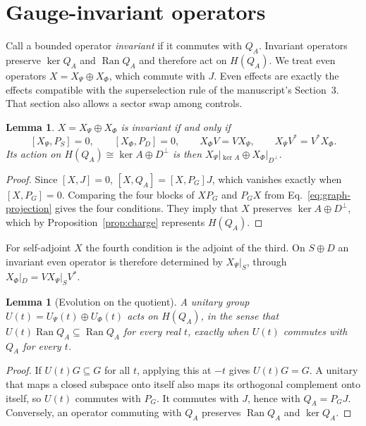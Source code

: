 \documentclass[11pt]{article}
\newtheorem{lemma}[proposition]{Lemma}
\theoremstyle{remark}
\newcommand{\Ran}{\operatorname{Ran}}
\begin{document}
\section{Gauge-invariant operators}

Call a bounded operator \emph{invariant} if it commutes with $Q_A$. Invariant operators preserve $\ker Q_A$ and $\Ran Q_A$ and therefore act on $H(Q_A)$. We treat even operators $X=X_\Psi\oplus X_\Phi$, which commute with $J$. Even effects are exactly the effects compatible with the superselection rule of the manuscript's Section~3. That section also allows a sector swap among controls.

\begin{lemma}\label{lem:invariant}
$X=X_\Psi\oplus X_\Phi$ is invariant if and only if
\[
 [X_\Psi,P_S]=0,\qquad [X_\Phi,P_D]=0,\qquad X_\Phi V=VX_\Psi,\qquad X_\Psi V^*=V^*X_\Phi .
\]
Its action on $H(Q_A)\cong\ker A\oplus D^\perp$ is then $X_\Psi|_{\ker A}\oplus X_\Phi|_{D^\perp}$.
\end{lemma}

\begin{proof}
Since $[X,J]=0$, $[X,Q_A]=[X,P_G]J$, which vanishes exactly when $[X,P_G]=0$. Comparing the four blocks of $XP_G$ and $P_GX$ from Eq.~\eqref{eq:graph-projection} gives the four conditions. They imply that $X$ preserves $\ker A\oplus D^\perp$, which by Proposition~\ref{prop:charge} represents $H(Q_A)$.
\end{proof}

For self-adjoint $X$ the fourth condition is the adjoint of the third. On $S\oplus D$ an invariant even operator is therefore determined by $X_\Psi|_S$, through $X_\Phi|_D=VX_\Psi|_SV^*$.

\begin{lemma}[Evolution on the quotient]\label{lem:quotient}
A unitary group $U(t)=U_\Psi(t)\oplus U_\Phi(t)$ acts on $H(Q_A)$, in the sense that $U(t)\Ran Q_A\subseteq\Ran Q_A$ for every real $t$, exactly when $U(t)$ commutes with $Q_A$ for every $t$.
\end{lemma}

\begin{proof}
If $U(t)G\subseteq G$ for all $t$, applying this at $-t$ gives $U(t)G=G$. A unitary that maps a closed subspace onto itself also maps its orthogonal complement onto itself, so $U(t)$ commutes with $P_G$. It commutes with $J$, hence with $Q_A=P_GJ$. Conversely, an operator commuting with $Q_A$ preserves $\Ran Q_A$ and $\ker Q_A$.
\end{proof}
\end{document}
